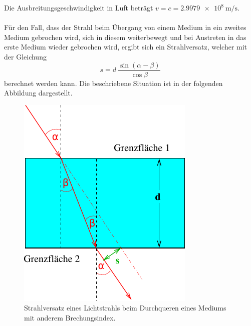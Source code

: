 \begin{description}
    Die Ausbreitungsgeschwindigkeit in Luft beträgt $v = c = \SI{2.9979e8}{\meter\per\second}$.\\
    \\
    Für den Fall,
    dass der Strahl beim Übergang von einem Medium in ein zweites Medium gebrochen wird,
    sich in diesem weiterbewegt und bei Austreten in das erste Medium wieder gebrochen wird,
    ergibt sich ein Strahlversatz,
    welcher mit der Gleichung
    \begin{equation}
        s = d \ \frac{\sin(\alpha - \beta)}{\cos\beta}
    \end{equation}
    berechnet werden kann.
    Die beschriebene Situation ist in der folgenden Abbildung dargestellt.
    \begin{figure}[H]
        \centering
        \includegraphics[scale=0.9]{content/img/Abb_5.pdf}
        \caption{Strahlversatz eines Lichtstrahls beim Durchqueren eines Mediums mit anderem Brechungsindex.}
        \label{fig:strahlversatz}
    \end{figure}


\end{description}
